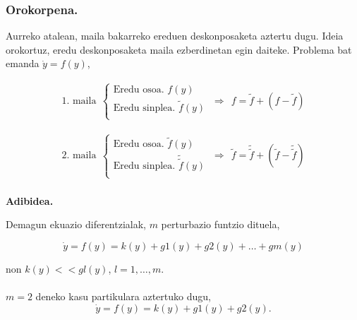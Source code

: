 \subsubsection*{Orokorpena.}

Aurreko atalean, maila bakarreko ereduen deskonposaketa aztertu dugu. Ideia orokortuz, eredu deskonposaketa maila ezberdinetan egin daiteke. Problema bat emanda $\dot{y} =f(y)$, 

\begin{align}
\mbox{1. maila} \ \
\left \{ \begin{array}{c}
  \mbox{Eredu osoa.   } f(y) \\[.25cm]
  \mbox{Eredu sinplea.    } \tilde{f}(y)  \\
\end{array} \right.
\ \Rightarrow \ \
f =\tilde{f}+(f-\tilde{f})  
\end{align}

\begin{align}
\mbox{2. maila} \ \
\left \{ \begin{array}{c}
  \mbox{Eredu osoa.   }\tilde{f}(y) \\[.25cm]
  \mbox{Eredu sinplea.    }\tilde{\tilde{f}}(y)  \\
\end{array} \right.
\ \Rightarrow \ \
\tilde{f} =\tilde{\tilde{f}}+({\tilde{f}}-\tilde{\tilde{f}})  
\end{align}

\paragraph*{} \textbf{Adibidea.}

Demagun ekuazio diferentzialak, $m$ perturbazio funtzio dituela,

\begin{equation*}
\dot{y}=f(y)=k(y)+g1(y)+g2(y)+\dots+gm(y)
\end{equation*}

non $k(y)<<gl(y)$,  $l=1,\dots,m$.

\paragraph*{}$m=2$ deneko kasu partikulara aztertuko dugu,
\begin{equation*}
\dot{y}=f(y)=k(y)+g1(y)+g2(y).
\end{equation*} 

